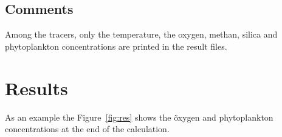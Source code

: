 %
\subsection{Comments}
Among the tracers, only the temperature, the oxygen, methan, silica and phytoplankton concentrations are printed in the result files.

%
%
\section{Results}

As an example the Figure~\ref{fig:res} shows the õxygen and phytoplankton concentrations at the end of the calculation.
%

